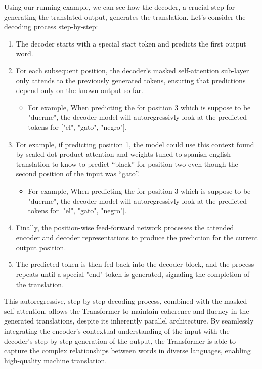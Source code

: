 Using our running example, we can see how the decoder, a crucial step for generating the translated output, generates the translation. Let's consider the decoding process step-by-step: \\
\begin{enumerate}
    \item The decoder starts with a special start token and predicts the first output word. 
    \item For each subsequent position, the decoder's masked self-attention sub-layer only attends to the previously generated tokens, ensuring that predictions depend only on the known output so far.
    \begin{itemize}
        \item For example, When predicting the for position 3 which is suppose to be "duerme", the decoder model will autoregressivly look at the predicted tokens for ["el", "gato", "negro"]. 
    \end{itemize}
    \item For example, if predicting position 1, the model could use this context found by scaled dot product attention and weights tuned to spanish-english translation to know to predict “black” for position two even though the second position of the input was “gato”.
    \begin{itemize}
        \item For example, When predicting the for position 3 which is suppose to be "duerme", the decoder model will autoregressivly look at the predicted tokens for ["el", "gato", "negro"]. 
    \end{itemize}
    \item Finally, the position-wise feed-forward network processes the attended encoder and decoder representations to produce the prediction for the current output position.
    \item The predicted token is then fed back into the decoder block, and the process repeats until a special "end" token is generated, signaling the completion of the translation.
\end{enumerate}

This autoregressive, step-by-step decoding process, combined with the masked self-attention, allows the Transformer to maintain coherence and fluency in the generated translations, despite its inherently parallel architecture. By seamlessly integrating the encoder's contextual understanding of the input with the decoder's step-by-step generation of the output, the Transformer is able to capture the complex relationships between words in diverse languages, enabling high-quality machine translation.

